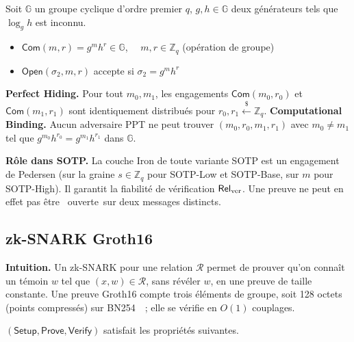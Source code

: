 \begin{sloppypar}
\begin{definition}\label{def:ann_pedersen}
Soit $\mathbb{G}$ un groupe cyclique d'ordre premier $q$,
$g, h \in \mathbb{G}$ deux générateurs tels que $\log_g h$ est inconnu.
\begin{itemize}
\item $\mathsf{Com}(m, r) = g^m h^r \in \mathbb{G}$, $\quad m,r \in \mathbb{Z}_q$ (op\'eration de groupe)
\item $\mathsf{Open}(\sigma_2, m, r)$ accepte si $\sigma_2 = g^m h^r$
\end{itemize}
\textbf{Perfect Hiding.} Pour tout $m_0, m_1$, les engagements
$\mathsf{Com}(m_0, r_0)$ et $\mathsf{Com}(m_1, r_1)$ sont identiquement
distribués pour $r_0, r_1 \xleftarrow{\$} \mathbb{Z}_q$.
\textbf{Computational Binding.} Aucun adversaire PPT ne peut trouver
$(m_0, r_0, m_1, r_1)$ avec $m_0 \neq m_1$ tel que
$g^{m_0} h^{r_0} = g^{m_1} h^{r_1}$ dans $\mathbb{G}$.
\end{definition}

\noindent\textbf{R\^ole dans SOTP.} La couche Iron de toute variante SOTP
est un engagement de Pedersen (sur la graine $s \in \mathbb{Z}_q$ pour SOTP-Low et
SOTP-Base, sur $m$ pour SOTP-High). Il garantit la fiabilit\'e de v\'erification
$\mathsf{Rel}_{\mathrm{ver}}$. Une preuve ne peut en effet pas \^etre \guillemotleft~ouverte~\guillemotright sur deux messages
distincts.

\subsection{zk-SNARK Groth16}

\noindent\textbf{Intuition.} Un zk-SNARK pour une relation $\mathcal{R}$
permet de prouver qu'on conna\^it un t\'emoin $w$ tel que $(x,w) \in
\mathcal{R}$, sans r\'ev\'eler $w$, en une preuve de taille constante.
Une preuve Groth16 compte trois \'el\'ements de groupe, soit 128 octets (points compress\'es) sur
BN254~\cite{BarretoNaehrig2006}~; elle se v\'erifie en $O(1)$ couplages.

\begin{definition}\label{def:ann_groth16}
$(\mathsf{Setup}, \mathsf{Prove}, \mathsf{Verify})$ satisfait les propri\'et\'es suivantes.


\end{definition}
\end{sloppypar}
